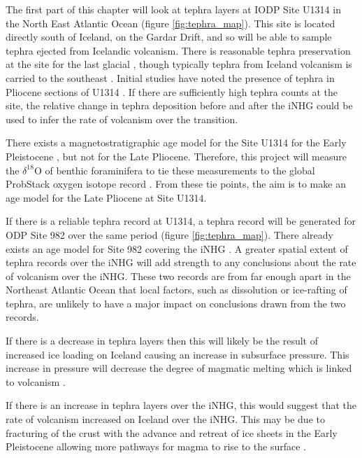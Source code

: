 The first part of this chapter will look at tephra layers at IODP Site U1314 in the North East Atlantic Ocean (figure \ref{fig:tephra_map}). This site is located directly south of Iceland, on the Gardar Drift, and so will be able to sample tephra ejected from Icelandic volcanism. There is reasonable tephra preservation at the site for the last glacial \citep{abbottTracingMarineCryptotephras2018}, though typically tephra from Iceland volcanism is carried to the southeast \citep{daviesWidespreadDispersalIcelandic2010}. Initial studies have noted the presence of tephra in Pliocene sections of U1314 \citep{channellMagneticRecordDeglaciation2016}. If there are sufficiently high tephra counts at the site, the relative change in tephra deposition before and after the iNHG could be used to infer the rate of volcanism over the transition.

There exists a magnetostratigraphic age model for the Site U1314 for the Early Pleistocene \citep{ohnoDetailedPaleomagneticRecord2012}, but not for the Late Pliocene. Therefore, this project will measure the $\delta^{18}\text{O}$ of benthic foraminifera to tie these measurements to the global ProbStack oxygen isotope record \citep{ahnProbabilisticPliocenePleistocene2017}. From these tie points, the aim is to make an age model for the Late Pliocene at Site U1314.

If there is a reliable tephra record at U1314, a tephra record will be generated for ODP Site 982 over the same period (figure \ref{fig:tephra_map}). There already exists an age model for Site 982 covering the iNHG \citep{khelifiTechnicalNoteLate2012}. A greater spatial extent of tephra records over the iNHG will add strength to any conclusions about the rate of volcanism over the iNHG. These two records are from far enough apart in the Northeast Atlantic Ocean that local factors, such as dissolution or ice-rafting of tephra, are unlikely to have a major impact on conclusions drawn from the two records.

If there is a decrease in tephra layers then this will likely be the result of increased ice loading on Iceland causing an increase in subsurface pressure. This increase in pressure will decrease the degree of magmatic melting which is linked to volcanism \citep{schmidtEffectsPresentdayDeglaciation2013,maclennanLinkVolcanismDeglaciation2002}. 

If there is an increase in tephra layers over the iNHG, this would suggest that the rate of volcanism increased on Iceland over the iNHG. This may be due to fracturing of the crust with the advance and retreat of ice sheets in the Early Pleistocene allowing more pathways for magma to rise to the surface \citep{jellinekDidMeltingGlaciers2004}. 

